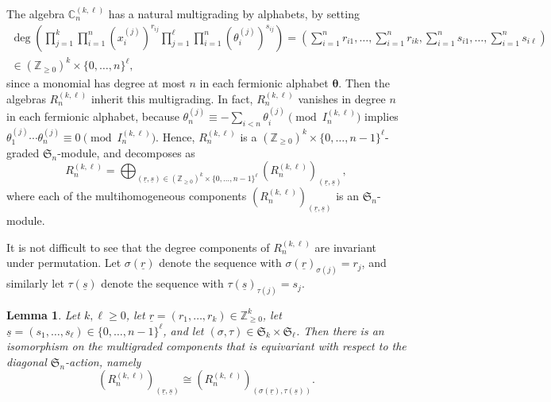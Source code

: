 \documentclass[11pt, reqno]{amsart}
\newtheorem{lemma}[theorem]{Lemma}
\theoremstyle{definition}
\theoremstyle{remark}
\numberwithin{equation}{section}
\newcommand{\0}{\emptyset}
\newcommand{\C}{\mathbb{C}}
\renewcommand{\S}{\mathfrak{S}}
\renewcommand{\r}{\underline{r}}
\newcommand{\s}{\underline{s}}
\begin{document}
The algebra $\C_n^{(k,\ell)}$ has a natural multigrading by alphabets, by setting 
\begin{align*}
    \deg \left(
    \prod_{j = 1}^{k} \prod_{i = 1}^{n} \left(x_i^{(j)}\right)^{r_{ij}} 
    \prod_{j = 1}^{\ell} \prod_{i = 1}^{n} \left(\theta_i^{(j)}\right)^{s_{ij}} 
    \right) = \left( 
    \sum_{i = 1}^{n} r_{i1}, \ldots, \sum_{i = 1}^{n} r_{ik}, 
    \sum_{i = 1}^{n} s_{i1}, \ldots, \sum_{i = 1}^{n} s_{i\ell}
    \right)&\\ 
    \in \left(\mathbb{Z}_{\geq0}\right)^{k} \times \{0,\ldots,n\}^{\ell},& 
\end{align*}
since a monomial has degree at most $n$ in each fermionic alphabet $\bm{\theta}$.
Then the algebras $R_n^{(k,\ell)}$ inherit this multigrading. 
In fact, $R_n^{(k,\ell)}$ vanishes in degree $n$ in each fermionic alphabet, 
because $\theta_n^{(j)} \equiv -\sum_{i<n}\theta_i^{(j)} \pmod{I_n^{(k,\ell)}}$ implies 
$\theta_1^{(j)}\cdots\theta_n^{(j)} \equiv 0 \pmod{I_n^{(k,\ell)}}$. Hence, $R_n^{(k,\ell)}$ is a
$\left(\mathbb{Z}_{\geq 0}\right)^{k} \times \{0,\ldots,n-1\}^{\ell}$-graded 
$\mathfrak{S}_n$-module, and decomposes as
\[
    R_n^{(k,\ell)}
    = \bigoplus_{(\r, \s) 
    \in (\mathbb{Z}_{\geq 0})^{k} \times \{0,\ldots,n-1\}^{\ell}} 
    \left(R_n^{(k,\ell)}\right)_{(\r, \s)},
\]
where each of the multihomogeneous components $\left(R_n^{(k,\ell)}\right)_{(\r,\s)}$ is an $\mathfrak{S}_n$-module. 

It is not difficult to see that the degree components of $R_n^{(k,\ell)}$ are invariant under permutation.
Let $\sigma(\r)$ denote the sequence with $\sigma(\r)_{\sigma(j)} = r_j$, and similarly let $\tau(\s)$ denote the sequence with $\tau(\s)_{\tau(j)} = s_j$.

\begin{lemma}
    \label{lem:degree-permutation}
    Let $k, \ell \geq 0$, 
    let  $\r=(r_1,\ldots, r_k) \in \mathbb{Z}_{\geq 0}^k$, 
    let $\s=(s_1,\ldots,s_\ell) \in \{0,\ldots,n-1\}^{\ell}$, 
    and let $(\sigma,\tau) \in \S_k \times \S_\ell$. 
    Then there is an isomorphism on 
    the multigraded components that is equivariant with respect to the diagonal 
    $\S_n$-action, namely 
    \begin{equation}
        \label{eq:permute graded components}
        \left(R_n^{(k,\ell)}\right)_{(\r,\s)} \cong 
        \left(R_n^{(k,\ell)}\right)_{(\sigma(\r),\tau(\s))}.
    \end{equation}
\end{lemma}
\end{document}
